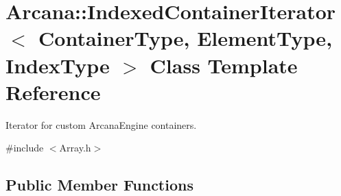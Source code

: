 \hypertarget{class_arcana_1_1_indexed_container_iterator}{}\section{Arcana\+:\+:Indexed\+Container\+Iterator$<$ Container\+Type, Element\+Type, Index\+Type $>$ Class Template Reference}
\label{class_arcana_1_1_indexed_container_iterator}


Iterator for custom Arcana\+Engine containers.  




{\ttfamily \#include $<$Array.\+h$>$}

\subsection*{Public Member Functions}

